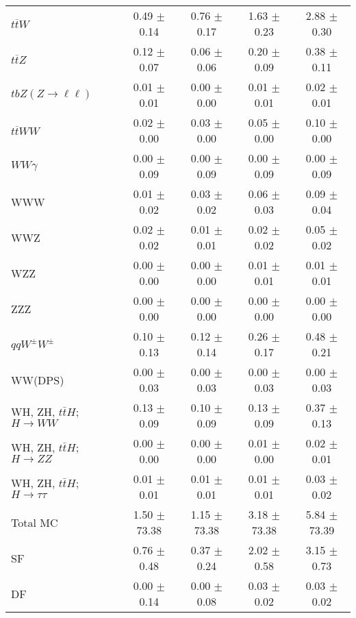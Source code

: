 \begin{tabular}{l|cccc}
                   $t\overline{t}W$ &  0.49 $\pm$  0.14 &  0.76 $\pm$  0.17 &  1.63 $\pm$  0.23 &  2.88 $\pm$  0.30 \\
                   $t\overline{t}Z$ &  0.12 $\pm$  0.07 &  0.06 $\pm$  0.06 &  0.20 $\pm$  0.09 &  0.38 $\pm$  0.11 \\
    $tbZ (Z \rightarrow \ell \ell)$ &  0.01 $\pm$  0.01 &  0.00 $\pm$  0.00 &  0.01 $\pm$  0.01 &  0.02 $\pm$  0.01 \\
                  $t\overline{t}WW$ &  0.02 $\pm$  0.00 &  0.03 $\pm$  0.00 &  0.05 $\pm$  0.00 &  0.10 $\pm$  0.00 \\
                         $WW\gamma$ &  0.00 $\pm$  0.09 &  0.00 $\pm$  0.09 &  0.00 $\pm$  0.09 &  0.00 $\pm$  0.09 \\
                                WWW &  0.01 $\pm$  0.02 &  0.03 $\pm$  0.02 &  0.06 $\pm$  0.03 &  0.09 $\pm$  0.04 \\
                                WWZ &  0.02 $\pm$  0.02 &  0.01 $\pm$  0.01 &  0.02 $\pm$  0.02 &  0.05 $\pm$  0.02 \\
                                WZZ &  0.00 $\pm$  0.00 &  0.00 $\pm$  0.00 &  0.01 $\pm$  0.01 &  0.01 $\pm$  0.01 \\
                                ZZZ &  0.00 $\pm$  0.00 &  0.00 $\pm$  0.00 &  0.00 $\pm$  0.00 &  0.00 $\pm$  0.00 \\
                 $qqW^{\pm}W^{\pm}$ &  0.10 $\pm$  0.13 &  0.12 $\pm$  0.14 &  0.26 $\pm$  0.17 &  0.48 $\pm$  0.21 \\
                            WW(DPS) &  0.00 $\pm$  0.03 &  0.00 $\pm$  0.03 &  0.00 $\pm$  0.03 &  0.00 $\pm$  0.03 \\
WH, ZH, $t\bar{t}H$; $H \rightarrow WW$ &  0.13 $\pm$  0.09 &  0.10 $\pm$  0.09 &  0.13 $\pm$  0.09 &  0.37 $\pm$  0.13 \\
WH, ZH, $t\bar{t}H$; $H \rightarrow ZZ$ &  0.00 $\pm$  0.00 &  0.00 $\pm$  0.00 &  0.01 $\pm$  0.00 &  0.02 $\pm$  0.01 \\
WH, ZH, $t\bar{t}H$; $H \rightarrow \tau\tau$ &  0.01 $\pm$  0.01 &  0.01 $\pm$  0.01 &  0.01 $\pm$  0.01 &  0.03 $\pm$  0.02 \\
\hline\hline
                           Total MC &  1.50 $\pm$ 73.38 &  1.15 $\pm$ 73.38 &  3.18 $\pm$ 73.38 &  5.84 $\pm$ 73.39 \\
\hline
                                 SF &  0.76 $\pm$  0.48 &  0.37 $\pm$  0.24 &  2.02 $\pm$  0.58 &  3.15 $\pm$  0.73 \\
                                 DF &  0.00 $\pm$  0.14 &  0.00 $\pm$  0.08 &  0.03 $\pm$  0.02 &  0.03 $\pm$  0.02 \\

\end{tabular}
